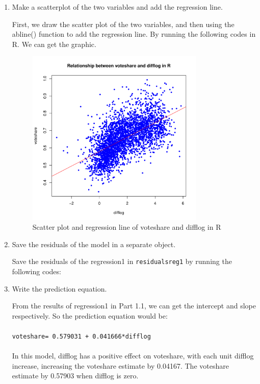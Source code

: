 \documentclass[12pt,letterpaper]{article}
\begin{document}
\begin{enumerate}
		\item Make a scatterplot of the two variables and add the regression line. 	\vspace{.15cm}
		
		\noindent First, we draw the scatter plot of the two variables, and then using the abline() function to add the regression line. By running the following codes in R. We can get the graphic.\\
		
		
		
		\begin{figure}[h]
			\centering
			\includegraphics[width=0.8\textwidth]{Scatter plot and regression line of voteshare and difflog in R.pdf}
			\caption{Scatter plot and regression line of voteshare and difflog in R}
			\label{fig:pdf}
		\end{figure}
		
		\newpage
		\item Save the residuals of the model in a separate object.	\vspace{.17cm}
		
		\noindent Save the residuals of the regression1 in \texttt{residuals\textunderscore{}reg1} by running the following codes:\\
		
		
		
		\item Write the prediction equation.
		
		\noindent From the results of regression1 in Part 1.1, we can get the intercept and slope respectively. So the prediction equation would be:\\  \\ \texttt{voteshare= 0.579031 + 0.041666*difflog} \\ \\ In this model, difflog has a positive effect on voteshare, with each unit difflog increase, increasing the voteshare estimate by 0.04167. The  voteshare estimate by 0.57903 when difflog is zero.\\
		
	\end{enumerate}
\end{document}
